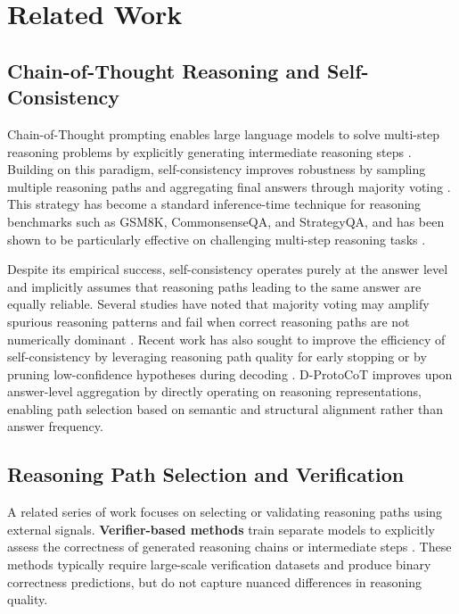 \documentclass[a4paper,fleqn]{cas-dc}
\begin{document}
\section{Related Work}

\subsection{Chain-of-Thought Reasoning and Self-Consistency}

Chain-of-Thought prompting enables large language models to solve multi-step reasoning problems by explicitly generating intermediate reasoning steps \citep{wei2023chainofthoughtpromptingelicitsreasoning}.
Building on this paradigm, self-consistency improves robustness by sampling multiple reasoning paths and aggregating final answers through majority voting \citep{wang2023selfconsistencyimproveschainofthoughtreasoning}.
This strategy has become a standard inference-time technique for reasoning benchmarks such as GSM8K, CommonsenseQA, and StrategyQA, and has been shown to be particularly effective on challenging multi-step reasoning tasks \citep{suzgun-etal-2023-challenging}.

Despite its empirical success, self-consistency operates purely at the answer level and implicitly assumes that reasoning paths leading to the same answer are equally reliable.
Several studies have noted that majority voting may amplify spurious reasoning patterns and fail when correct reasoning paths are not numerically dominant \citep{fu2023complexitybased, zhou2023leasttomost}.
Recent work has also sought to improve the efficiency of self-consistency by leveraging reasoning path quality for early stopping \citep{wan2025reasoning} or by pruning low-confidence hypotheses during decoding \citep{sultan-astudillo-2025-confidence}.
D-ProtoCoT improves upon answer-level aggregation by directly operating on reasoning representations, enabling path selection based on semantic and structural alignment rather than answer frequency.

\subsection{Reasoning Path Selection and Verification}

A related series of work focuses on selecting or validating reasoning paths using external signals.
\textbf{Verifier-based methods} train separate models to explicitly assess the correctness of generated reasoning chains or intermediate steps \citep{cobbe2021trainingverifiers, lightman2023letsverify}.
These methods typically require large-scale verification datasets and produce binary correctness predictions, but do not capture nuanced differences in reasoning quality.
\end{document}
